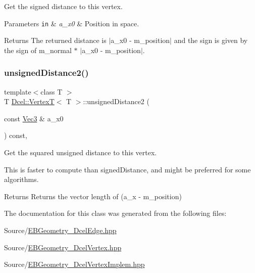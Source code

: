 Get the signed distance to this vertex. 


\begin{DoxyParams}[1]{Parameters}
\mbox{\tt in}  & {\em a\+\_\+x0} & Position in space. \\
\hline
\end{DoxyParams}
\begin{DoxyReturn}{Returns}
The returned distance is $\vert$a\+\_\+x0 -\/ m\+\_\+position$\vert$ and the sign is given by the sign of m\+\_\+normal $\ast$ $\vert$a\+\_\+x0 -\/ m\+\_\+position$\vert$. 
\end{DoxyReturn}
\mbox{\label{classDcel_1_1VertexT_a552b7d88dfe80c76561b5a002ddc176b}} 
\subsubsection{\texorpdfstring{unsigned\+Distance2()}{unsignedDistance2()}}
{\footnotesize\ttfamily template$<$class T $>$ \\
T \hyperlink{classDcel_1_1VertexT}{Dcel\+::\+VertexT}$<$ T $>$\+::unsigned\+Distance2 (\begin{DoxyParamCaption}\item[{const \hyperlink{classDcel_1_1VertexT_a6e073dc7426756edef5594816be6e7c7}{Vec3} \&}]{a\+\_\+x0 }\end{DoxyParamCaption}) const\hspace{0.3cm}{\ttfamily [inline]}, {\ttfamily [noexcept]}}



Get the squared unsigned distance to this vertex. 

This is faster to compute than signed\+Distance, and might be preferred for some algorithms. \begin{DoxyReturn}{Returns}
Returns the vector length of (a\+\_\+x -\/ m\+\_\+position) 
\end{DoxyReturn}


The documentation for this class was generated from the following files\+:\begin{DoxyCompactItemize}
\item 
Source/\hyperlink{EBGeometry__DcelEdge_8hpp}{E\+B\+Geometry\+\_\+\+Dcel\+Edge.\+hpp}\item 
Source/\hyperlink{EBGeometry__DcelVertex_8hpp}{E\+B\+Geometry\+\_\+\+Dcel\+Vertex.\+hpp}\item 
Source/\hyperlink{EBGeometry__DcelVertexImplem_8hpp}{E\+B\+Geometry\+\_\+\+Dcel\+Vertex\+Implem.\+hpp}\end{DoxyCompactItemize}
